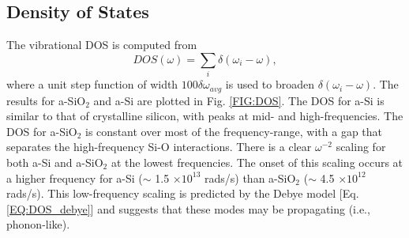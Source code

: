 \documentclass[aps,prb,onecolumn,preprint,superscriptaddress,footinbib,amsmath,amssymb,floatfix]{revtex4}
\begin{document}
\subsection{\label{S:DOS}Density of States}

The vibrational DOS is computed from  
\begin{equation}\label{EQ:DOS}
DOS(\omega) = \sum_i \delta(\omega_i - \omega),
\end{equation}
where a unit step function of width $100\delta\omega_{avg}$ 
is used to broaden $\delta(\omega_i - \omega)$.   
The results for a-SiO$_2$ and a-Si are plotted in Fig. \ref{FIG:DOS}. 
The DOS for a-Si is similar to that of crystalline silicon,
\cite{allen_diffusons_1999,donadio_atomistic_2009} with 
peaks at mid- and high-frequencies. The DOS for 
a-SiO$_2$ is constant over most of the frequency-range, 
with a gap that separates the high-frequency Si-O
interactions.\cite{mcgaughey_thermal_2004} 
There is a clear $\omega^{-2}$ scaling for both 
a-Si and a-SiO$_2$ at the lowest frequencies. 
The onset of this scaling occurs at a higher frequency 
for a-Si ($\sim$ 1.5 $\times 10^{13}$ rads/s) 
than a-SiO$_2$ ($\sim$ 4.5 $\times 10^{12}$ rads/s). 
This low-frequency scaling is predicted 
by the Debye model [Eq. \eqref{EQ:DOS_debye}] 
and suggests that these modes may be 
propagating (i.e., phonon-like). 
\end{document}
